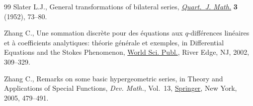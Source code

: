 \documentclass[11pt]{article}
\numberwithin{equation}{section}
\begin{document}
\begin{thebibliography}{99}
Slater L.J., General transformations of bilateral series, \href{https://doi.org/10.1093/qmath/3.1.73}{\textit{Quart.~J.
 Math.}} \textbf{3} (1952), 73--80.

Zhang C., Une sommation discr\`ete pour des \'{e}quations aux
 {$q$}-diff\'{e}rences lin\'{e}aires et \`a coefficients analytiques:
 th\'{e}orie g\'{e}n\'{e}rale et exemples, in Differential Equations and the
 {S}tokes Phenomenon, \href{https://doi.org/10.1142/9789812776549_0012}{World Sci. Publ.}, River Edge, NJ, 2002, 309--329.

Zhang C., Remarks on some basic hypergeometric series, in Theory and
 Applications of Special Functions, \textit{Dev. Math.}, Vol.~13, \href{https://doi.org/10.1007/0-387-24233-3_22}{Springer},
 New York, 2005, 479--491.

\end{thebibliography}
\end{document}
